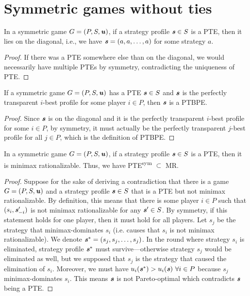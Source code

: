 \section{Symmetric games without ties}

\begin{observation}
	 In a symmetric game $G = (P, S, \boldsymbol{\mathit{u}})$, if a strategy profile $\boldsymbol{\mathit{s}} \in S$ is a PTE, then it lies on the diagonal, i.e., we have $\boldsymbol{\mathit{s}} = (a, a, \dots, a)$ for some strategy $a$.
\end{observation}

\begin{proof}
	If there was a PTE somewhere else than on the diagonal, we would necessarily have multiple PTEs by symmetry, contradicting the uniqueness of PTE.
\end{proof}

\begin{corollary}
	If a symmetric game $G = (P, S, \boldsymbol{\mathit{u}})$ has a PTE $\boldsymbol{\mathit{s}} \in S$ and $\boldsymbol{\mathit{s}}$ is the perfectly transparent $i$-best profile for some player $i \in P$, then $\boldsymbol{\mathit{s}}$ is a PTBPE. 
\end{corollary}

\begin{proof}
	Since $\boldsymbol{\mathit{s}}$ is on the diagonal and it is the perfectly transparent $i$-best profile for some $i \in P$, by symmetry, it must actually be the perfectly transparent $j$-best profile for all $j \in P$, which is the definition of PTBPE.
\end{proof}

\begin{lemma}
	In a symmetric game $G = (P, S, \boldsymbol{\mathit{u}})$, if a strategy profile $\boldsymbol{\mathit{s}} \in S$ is a PTE, then it is minimax rationalizable.
	Thus, we have PTE\textsuperscript{sym} $\subset$ MR.
\end{lemma}

\begin{proof}
	Suppose for the sake of deriving a contradiction that there is a game $G = (P, S, \boldsymbol{\mathit{u}})$ and a strategy profile $\boldsymbol{\mathit{s}} \in S$ that is a PTE but not minimax rationalizable.
	By definition, this means that there is some player $i \in P$ such that $(s_i, \boldsymbol{\mathit{s}}_{-i}')$ is not minimax rationalizable for any $\boldsymbol{\mathit{s}}' \in S$.
	By symmetry, if this statement holds for one player, then it must hold for all players.
	Let $s_j$ be the strategy that minimax-dominates $s_i$ (i.e. causes that $s_i$ is not minimax rationalizable).
	We denote $\boldsymbol{\mathit{s}}^* = (s_j, s_j, \dots, s_j)$.
	In the round where strategy $s_i$ is eliminated, strategy profile $\boldsymbol{\mathit{s}}^*$ must survive---otherwise strategy $s_j$ would be eliminated as well, but we supposed that $s_j$ is the strategy that caused the elimination of $s_i$.
	Moreover, we must have $u_i(\boldsymbol{\mathit{s}}^*) > u_i(\boldsymbol{\mathit{s}})\ \forall i \in P$ because $s_j$ minimax-dominates $s_i$.
	This means $\boldsymbol{\mathit{s}}$ is not Pareto-optimal which contradicts $\boldsymbol{\mathit{s}}$ being a PTE.
\end{proof}
